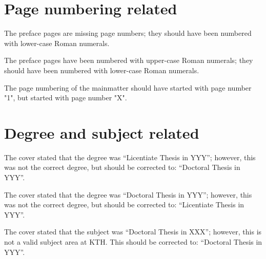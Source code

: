 \documentclass[
English,                 %
biblatex,             %
]{kththesis}
\begin{document}
\section*{Page numbering related}

The preface pages are missing page numbers; they should have been numbered with lower-case Roman numerals.

The preface pages have been numbered with upper-case Roman numerals; they should have been numbered with lower-case Roman numerals.

The page numbering of the mainmatter should have started with page number "1", but started with page number "X".


\section*{Degree and subject related}
The cover stated that the degree was ``Licentiate Thesis in YYY''; however, this was not the correct degree, but should be corrected to: ``Doctoral Thesis in YYY''.

The cover stated that the degree was ``Doctoral Thesis in YYY''; however, this was not the correct degree, but should be corrected to: ``Licentiate Thesis in YYY''.

The cover stated that the subject was ``Doctoral Thesis in XXX''; however, this is not a valid subject area at KTH. This should be corrected to: ``Doctoral Thesis in YYY''.


\end{document}
